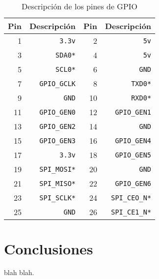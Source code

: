 \begin{table}
\centering
  \begin{tabular}{r r r r}
\textbf{Pin} & \textbf{Descripción} & \textbf{Pin} & \textbf{Descripción} \\
\hline
1 & \texttt{3.3v} & 2 & \texttt{5v} \\
3 & \texttt{SDA0*} & 4 & \texttt{5v} \\
5 & \texttt{SCL0*} & 6 & \texttt{GND} \\
7 &  \texttt{GPIO\_GCLK} & 8 & \texttt{TXD0*} \\
9 &  \texttt{GND} & 10 & \texttt{RXD0*} \\
11 &  \texttt{GPIO\_GEN0} & 12 & \texttt{GPIO\_GEN1} \\
13 &  \texttt{GPIO\_GEN2} & 14 & \texttt{GND} \\
15 &  \texttt{GPIO\_GEN3} & 16 & \texttt{GPIO\_GEN4} \\
17 &  \texttt{3.3v} & 18 & \texttt{GPIO\_GEN5} \\
19 &  \texttt{SPI\_MOSI*} & 20 & \texttt{GND} \\
21 &  \texttt{SPI\_MISO*} & 22 & \texttt{GPIO\_GEN6} \\
23 &  \texttt{SPI\_SCLK*} & 24 & \texttt{SPI\_CEO\_N*} \\
25 &  \texttt{GND} & 26 & \texttt{SPI\_CE1\_N*} \\
  \end{tabular}
  \caption{Descripción de los pines de GPIO}
  \label{table:gpio_descr}
\end{table}

\section{Conclusiones}

blah blah.
